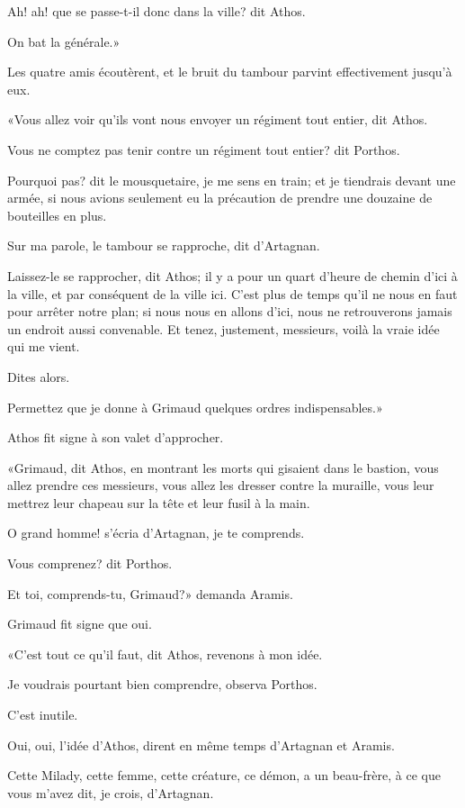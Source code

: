 \speak  Ah! ah! que se passe-t-il donc dans la ville? dit Athos. 

\speak  On bat la générale.» 

Les quatre amis écoutèrent, et le bruit du tambour parvint effectivement jusqu'à eux. 

«Vous allez voir qu'ils vont nous envoyer un régiment tout entier, dit Athos. 

\speak  Vous ne comptez pas tenir contre un régiment tout entier? dit Porthos. 

\speak  Pourquoi pas? dit le mousquetaire, je me sens en train; et je tiendrais devant une armée, si nous avions seulement eu la précaution de prendre une douzaine de bouteilles en plus. 

\speak  Sur ma parole, le tambour se rapproche, dit d'Artagnan. 

\speak  Laissez-le se rapprocher, dit Athos; il y a pour un quart d'heure de chemin d'ici à la ville, et par conséquent de la ville ici. C'est plus de temps qu'il ne nous en faut pour arrêter notre plan; si nous nous en allons d'ici, nous ne retrouverons jamais un endroit aussi convenable. Et tenez, justement, messieurs, voilà la vraie idée qui me vient. 

\speak  Dites alors. 

\speak  Permettez que je donne à Grimaud quelques ordres indispensables.» 

Athos fit signe à son valet d'approcher. 

«Grimaud, dit Athos, en montrant les morts qui gisaient dans le bastion, vous allez prendre ces messieurs, vous allez les dresser contre la muraille, vous leur mettrez leur chapeau sur la tête et leur fusil à la main. 

\speak  O grand homme! s'écria d'Artagnan, je te comprends. 

\speak  Vous comprenez? dit Porthos. 

\speak  Et toi, comprends-tu, Grimaud?» demanda Aramis. 

Grimaud fit signe que oui. 

«C'est tout ce qu'il faut, dit Athos, revenons à mon idée. 

\speak  Je voudrais pourtant bien comprendre, observa Porthos. 

\speak  C'est inutile. 

\speak  Oui, oui, l'idée d'Athos, dirent en même temps d'Artagnan et Aramis. 

\speak  Cette Milady, cette femme, cette créature, ce démon, a un beau-frère, à ce que vous m'avez dit, je crois, d'Artagnan. 

